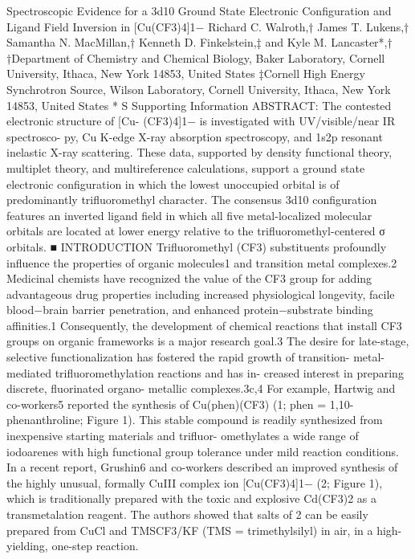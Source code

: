 Spectroscopic Evidence for a 3d10 Ground State Electronic
Conﬁguration and Ligand Field Inversion in [Cu(CF3)4]1−
Richard C. Walroth,† James T. Lukens,† Samantha N. MacMillan,† Kenneth D. Finkelstein,‡
and Kyle M. Lancaster*,†
†Department of Chemistry and Chemical Biology, Baker Laboratory, Cornell University, Ithaca, New York 14853, United States
‡Cornell High Energy Synchrotron Source, Wilson Laboratory, Cornell University, Ithaca, New York 14853, United States
*
S Supporting Information
ABSTRACT: The contested electronic structure of [Cu-
(CF3)4]1− is investigated with UV/visible/near IR spectrosco-
py, Cu K-edge X-ray absorption spectroscopy, and 1s2p
resonant inelastic X-ray scattering. These data, supported by
density functional theory, multiplet theory, and multireference
calculations, support a ground state electronic conﬁguration in
which the lowest unoccupied orbital is of predominantly
triﬂuoromethyl character. The consensus 3d10 conﬁguration
features an inverted ligand ﬁeld in which all ﬁve metal-localized
molecular orbitals are located at lower energy relative to the
triﬂuoromethyl-centered σ orbitals.
■ INTRODUCTION
Triﬂuoromethyl (CF3) substituents profoundly inﬂuence the
properties of organic molecules1 and transition metal
complexes.2 Medicinal chemists have recognized the value of
the CF3 group for adding advantageous drug properties
including increased physiological longevity, facile blood−brain
barrier penetration, and enhanced protein−substrate binding
aﬃnities.1 Consequently, the development of chemical
reactions that install CF3 groups on organic frameworks is a
major research goal.3 The desire for late-stage, selective
functionalization has fostered the rapid growth of transition-
metal-mediated triﬂuoromethylation reactions and has in-
creased interest in preparing discrete, ﬂuorinated organo-
metallic complexes.3c,4 For example, Hartwig and co-workers5
reported the synthesis of Cu(phen)(CF3) (1; phen = 1,10-
phenanthroline; Figure 1). This stable compound is readily
synthesized from inexpensive starting materials and triﬂuor-
omethylates a wide range of iodoarenes with high functional
group tolerance under mild reaction conditions.
In a recent report, Grushin6 and co-workers described an
improved synthesis of the highly unusual, formally CuIII
complex ion [Cu(CF3)4]1− (2; Figure 1), which is traditionally
prepared with the toxic and explosive Cd(CF3)2 as a
transmetalation reagent. The authors showed that salts of 2
can be easily prepared from CuCl and TMSCF3/KF (TMS =
trimethylsilyl) in air, in a high-yielding, one-step reaction.
